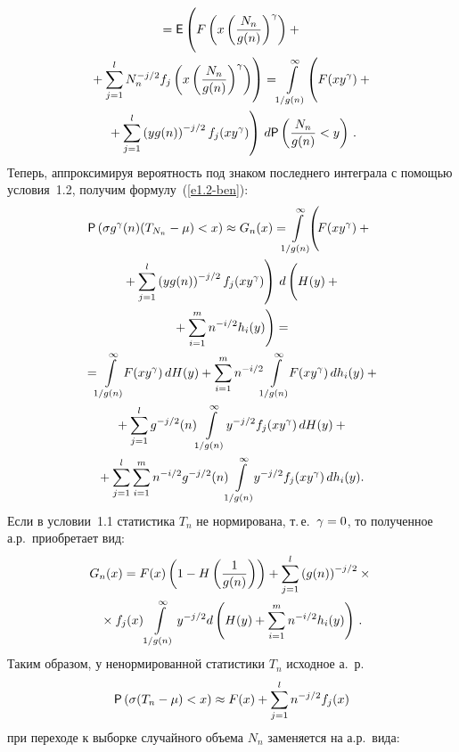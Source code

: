 \begin{multicols}{2}
\noindent
\begin{multline}
{}
= {\e} \left( \vphantom{\sum\limits_{j=1}^l\
k^{-j/2}f_j\left(x\left(\fr{k}{g(n)}\right)^\gamma\right)}
F\left(x \left(\fr{N_n}{g(n)}\right)^\gamma\right) +{}\right.\\
\left.{}+
\sum\limits_{j=1}^l 
N_n^{-j/2}f_j\left(x\left(\fr{N_n}{g(n)}\right)^\gamma\right)\right)
= \!\int\limits_{1/g(n)}^\infty \!\left(
\vphantom{\sum\limits_{j=1}^l}
F(x y^\gamma) +{}\right.\\
\left.{}+ \sum\limits_{j=1}^l
\left(yg(n)\right)^{-j/2}f_j(xy^\gamma)\right)\, d
{\p}\left(\fr{N_n}{g(n)} < y\right)\,.\label{e2.2}
\end{multline}
Теперь, аппроксимируя вероятность под знаком последнего интеграла с
помощью условия~1.2, получим формулу~(\ref{e1.2-ben}):
\begin{multline}
\!\!\!{\p}\left(\sigma g^\gamma(n)(T_{N_n} - \mu) < x\right) \approx G_n(x)
=\!\!\! \int\limits_{1/g(n)}^\infty\! \!\!\left(\!
\vphantom{\sum\limits_{j=1}^l}
F(x y^\gamma) + {}\right.\hspace*{-3.19522pt}\\
\left.{}+\sum\limits_{j=1}^l
\left(yg(n)\right)^{-j/2}f_j(xy^\gamma)\right)\, d \left(
\vphantom{\sum\limits_{i=1}^m}
H(y) +{}\right.\\
\left.{}+
\sum\limits_{i=1}^m n^{-i/2} h_i(y)\right) ={}\\
{}
 = \!\!\int\limits_{1/g(n)}^\infty\!\! F(x y^\gamma)\, dH(y) + 
 \sum\limits_{i=1}^m n^{-i/2} \!\!\int\limits_{1/g(n)}^\infty \!\!F(xy^\gamma) \,dh_i(y) +{}
\\
{}+ \sum\limits_{j=1}^l g^{-j/2}(n) \!\int\limits_{1/g(n)}^\infty\!
y^{-j/2}f_j(xy^\gamma) \,dH(y) +{}\\
\!\!\!{}+
\sum\limits_{j=1}^l \sum\limits_{i=1}^m n^{-i/2}g^{-j/2}(n)\!\!
\int\limits_{1/g(n)}^\infty \!\!y^{-j/2}f_j(xy^\gamma)
\,dh_i(y).\!\!
\label{e2.3-ben}
\end{multline}
Если в условии~1.1 статистика $T_n$ не нормирована, т.\,е.\
$\gamma\hm=0$, то полученное а.р.\ приобретает вид:
\begin{multline*}
G_n(x) =   F(x)\left(1 - H\left(\fr{1}{g(n)}\right)\right) +
 \sum\limits_{j=1}^l \left(g(n)\right)^{-j/2}\times{}\\
{}\times f_j(x)
\int\limits_{1/g(n)}^\infty y^{-j/2} d \left(H(y) + \sum\limits_{i=1}^m
n^{-i/2} h_i(y)\right)\,. %
\end{multline*}
Таким образом, у ненормированной статистики $T_n$ исходное а.~р.
$$
{{\sf P}}\left(\sigma (T_n  -  \mu)  <  x\right) \approx  F(x) +
\sum\limits_{j=1}^l n^{-j/2} f_j(x)
$$
при переходе к выборке случайного объема $N_n$  заменяется на а.р.\
вида:


\end{multicols}
